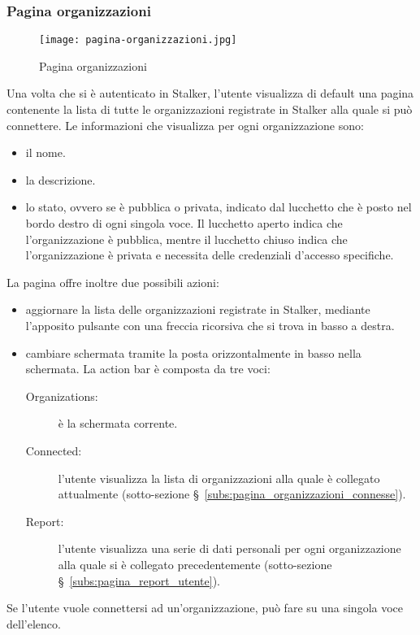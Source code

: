 \documentclass[../manuale-utente.tex]{subfiles}
\begin{document}
\subsubsection{Pagina organizzazioni}%
\label{subs:pagina_organizzazioni}

\begin{figure}[H]
    \centering
    \texttt{[image: pagina-organizzazioni.jpg]}
    \caption{Pagina organizzazioni}%
    \label{fig:mobile_app_pagina_organizzazioni}
\end{figure}
Una volta che si è autenticato in Stalker, l'utente visualizza di default una pagina contenente la lista di tutte le organizzazioni registrate in Stalker alla quale si può connettere.
Le informazioni che visualizza per ogni organizzazione sono:
\begin{itemize}
  \item il nome.
  \item la descrizione.
  \item lo stato, ovvero se è pubblica o privata, indicato dal lucchetto che è posto nel bordo destro di ogni singola voce. Il lucchetto aperto indica che l'organizzazione è pubblica, mentre il lucchetto chiuso indica che l'organizzazione è privata e necessita delle credenziali d'accesso specifiche.
\end{itemize}
La pagina offre inoltre due possibili azioni:
\begin{itemize}
  \item aggiornare la lista delle organizzazioni registrate in Stalker, mediante l'apposito pulsante con una freccia ricorsiva che si trova in basso a destra.
  \item cambiare schermata tramite la  posta orizzontalmente in basso nella schermata. La action bar è composta da tre voci:
  \begin{description}
    \item[Organizations:] è la schermata corrente.
    \item[Connected:] l'utente visualizza la lista di organizzazioni alla quale è collegato attualmente (sotto-sezione §~\ref{subs:pagina_organizzazioni_connesse}).
    \item[Report:] l'utente visualizza una serie di dati personali per ogni organizzazione alla quale si è collegato precedentemente (sotto-sezione §~\ref{subs:pagina_report_utente}).
  \end{description}
\end{itemize}
Se l'utente vuole connettersi ad un'organizzazione, può fare  su una singola voce dell'elenco.
\end{document}
